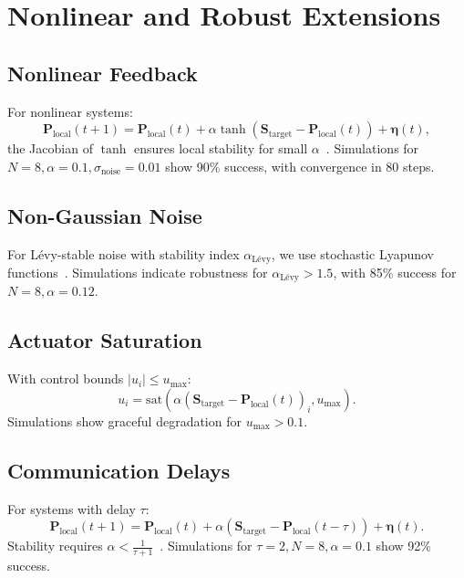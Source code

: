 \documentclass[12pt]{article}
\begin{document}
\section{Nonlinear and Robust Extensions}
\label{sec:nonlinear}
\subsection{Nonlinear Feedback}
For nonlinear systems:
\begin{equation}
\mathbf{P}_{\text{local}}(t+1) = \mathbf{P}_{\text{local}}(t) + \alpha \tanh(\mathbf{S}_{\text{target}} - \mathbf{P}_{\text{local}}(t)) + \mathbf{\eta}(t),
\label{eq:nonlinear_tanh}
\end{equation}
the Jacobian of $\tanh$ ensures local stability for small $\alpha$~\citep{Khalil2002}. Simulations for $N=8, \alpha=0.1, \sigma_{\text{noise}}=0.01$ show 90\% success, with convergence in 80 steps.

\subsection{Non-Gaussian Noise}
For L\'evy-stable noise with stability index $\alpha_{\text{L\'evy}}$, we use stochastic Lyapunov functions~\citep{Mao2007}. Simulations indicate robustness for $\alpha_{\text{L\'evy}} > 1.5$, with 85\% success for $N=8, \alpha=0.12$.

\subsection{Actuator Saturation}
With control bounds $|u_i| \leq u_{\max}$:
\begin{equation}
u_i = \text{sat}(\alpha (\mathbf{S}_{\text{target}} - \mathbf{P}_{\text{local}}(t))_i, u_{\max}).
\label{eq:saturation}
\end{equation}
Simulations show graceful degradation for $u_{\max} > 0.1$.

\subsection{Communication Delays}
For systems with delay $\tau$:
\begin{equation}
\mathbf{P}_{\text{local}}(t+1) = \mathbf{P}_{\text{local}}(t) + \alpha (\mathbf{S}_{\text{target}} - \mathbf{P}_{\text{local}}(t-\tau)) + \mathbf{\eta}(t).
\label{eq:delay}
\end{equation}
Stability requires $\alpha < \frac{1}{\tau + 1}$~\citep{OlfatiSaber2007}. Simulations for $\tau=2, N=8, \alpha=0.1$ show 92\% success.
\end{document}
